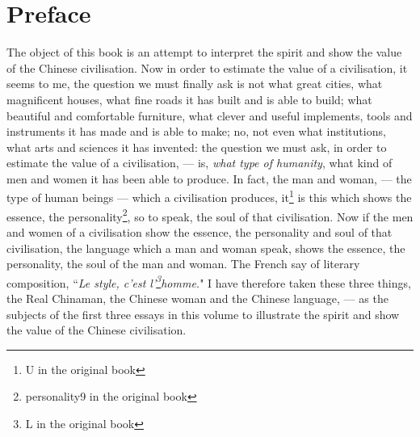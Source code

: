 \chapter{Preface}
The object of this book is an attempt to interpret the spirit and show the value of the Chinese civilisation.
Now in order to estimate the value of a civilisation, it seems to me, the question we must finally ask is not what great cities, what magnificent houses, what fine roads it has built and is able to build; what beautiful and comfortable furniture, what clever and useful implements, tools and instruments it has made and is able to make; no, not even what institutions, what arts and sciences it has invented: the question we must ask, in order to estimate the value of a civilisation, --- is, \emph{what type of humanity}, what kind of men and women it has been able to produce.
In fact, the man and woman, --- the type of human beings --- which a civilisation produces, it\footnote{U in the original book} is this which shows the essence, the personality\footnote{personality9 in the original book}, so to speak, the soul of that civilisation.
Now if the men and women of a civilisation show the essence, the personality and soul of that civilisation, the language which a man and woman speak, shows the essence, the personality, the soul of the man and woman.
The French say of literary composition, ``\emph{Le style, c'est l'\footnote{L in the original book}homme.}"
I have therefore taken these three things, the Real Chinaman, the Chinese woman and the Chinese language, --- as the subjects of the first three essays in this volume to illustrate the spirit and show the value of the Chinese civilisation.

